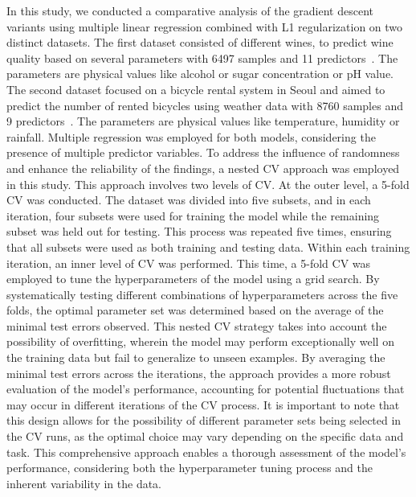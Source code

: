 \documentclass[10pt,conference,compsocconf]{IEEEtran}
\begin{document}
In this study, we conducted a comparative analysis of the gradient descent variants using multiple linear regression combined with L1 regularization on two distinct datasets. 
The first dataset consisted of different wines, to predict wine quality based on several parameters with 6497 samples and 11 predictors~\cite{misc_wine_quality_186}. 
The parameters are physical values like alcohol or sugar concentration or pH value.
The second dataset focused on a bicycle rental system in Seoul and aimed to predict the number of rented bicycles using weather data with 8760 samples and 9 predictors~\cite{misc_seoul_bike_sharing_demand_560}. 
The parameters are physical values like temperature, humidity or rainfall.
Multiple regression was employed for both models, considering the presence of multiple predictor variables. 
To address the influence of randomness and enhance the reliability of the findings, a nested CV approach was employed in this study. This approach involves two levels of CV.
At the outer level, a 5-fold CV was conducted. The dataset was divided into five subsets, and in each iteration, four subsets were used for training the model while the remaining subset was held out for testing. This process was repeated five times, ensuring that all subsets were used as both training and testing data.
Within each training iteration, an inner level of CV was performed. This time, a 5-fold CV was employed to tune the hyperparameters of the model using a grid search. By systematically testing different combinations of hyperparameters across the five folds, the optimal parameter set was determined based on the average of the minimal test errors observed.
This nested CV strategy takes into account the possibility of overfitting, wherein the model may perform exceptionally well on the training data but fail to generalize to unseen examples. By averaging the minimal test errors across the iterations, the approach provides a more robust evaluation of the model's performance, accounting for potential fluctuations that may occur in different iterations of the CV process.
It is important to note that this design allows for the possibility of different parameter sets being selected in the CV runs, as the optimal choice may vary depending on the specific data and task. This comprehensive approach enables a thorough assessment of the model's performance, considering both the hyperparameter tuning process and the inherent variability in the data.
\end{document}
